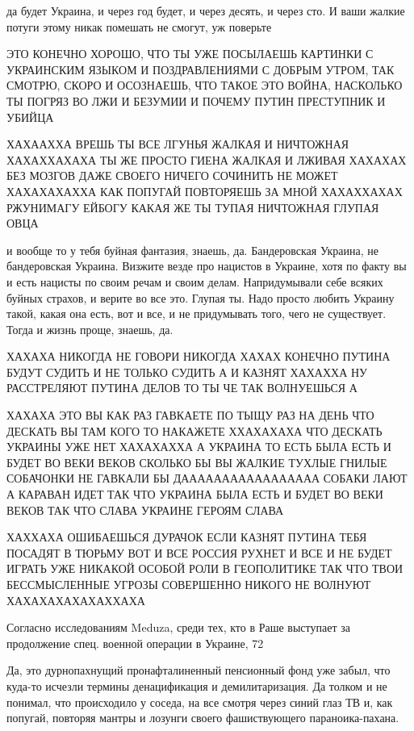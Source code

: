да будет Украина, и через год будет, и через десять, и через сто. И ваши жалкие
потуги этому никак помешать не смогут, уж поверьте

ЭТО КОНЕЧНО ХОРОШО, ЧТО ТЫ УЖЕ ПОСЫЛАЕШЬ КАРТИНКИ С УКРАИНСКИМ ЯЗЫКОМ И
ПОЗДРАВЛЕНИЯМИ С ДОБРЫМ УТРОМ, ТАК СМОТРЮ, СКОРО И ОСОЗНАЕШЬ, ЧТО ТАКОЕ ЭТО
ВОЙНА, НАСКОЛЬКО ТЫ ПОГРЯЗ ВО ЛЖИ И БЕЗУМИИ И ПОЧЕМУ ПУТИН ПРЕСТУПНИК И УБИЙЦА

ХАХААХХА ВРЕШЬ ТЫ ВСЕ ЛГУНЬЯ ЖАЛКАЯ И НИЧТОЖНАЯ ХАХАХХАХАХА ТЫ ЖЕ ПРОСТО ГИЕНА
ЖАЛКАЯ И ЛЖИВАЯ ХАХАХАХ БЕЗ МОЗГОВ ДАЖЕ СВОЕГО НИЧЕГО СОЧИНИТЬ НЕ МОЖЕТ
ХАХАХАХАХХА КАК ПОПУГАЙ ПОВТОРЯЕШЬ ЗА МНОЙ ХАХАХХАХАХ РЖУНИМАГУ ЕЙБОГУ КАКАЯ ЖЕ
ТЫ ТУПАЯ НИЧТОЖНАЯ ГЛУПАЯ ОВЦА




и вообще то у тебя буйная фантазия, знаешь, да. Бандеровская Украина, не
бандеровская Украина. Визжите везде про нацистов в Украине, хотя по факту вы и
есть нацисты по своим речам и своим делам. Напридумывали себе всяких буйных
страхов, и верите во все это. Глупая ты. Надо просто любить Украину такой,
какая она есть, вот и все, и не придумывать того, чего не существует. Тогда и
жизнь проще, знаешь, да.

ХАХАХА НИКОГДА НЕ ГОВОРИ НИКОГДА ХАХАХ КОНЕЧНО ПУТИНА БУДУТ СУДИТЬ И НЕ ТОЛЬКО
СУДИТЬ А И КАЗНЯТ ХАХАХХА НУ РАССТРЕЛЯЮТ ПУТИНА ДЕЛОВ ТО ТЫ ЧЕ ТАК ВОЛНУЕШЬСЯ А

ХАХАХА ЭТО ВЫ КАК РАЗ ГАВКАЕТЕ ПО ТЫЩУ РАЗ НА ДЕНЬ ЧТО ДЕСКАТЬ ВЫ ТАМ КОГО ТО
НАКАЖЕТЕ ХХАХАХАХА ЧТО ДЕСКАТЬ УКРАИНЫ УЖЕ НЕТ ХАХАХАХХА А УКРАИНА ТО ЕСТЬ БЫЛА
ЕСТЬ И БУДЕТ ВО ВЕКИ ВЕКОВ СКОЛЬКО БЫ ВЫ ЖАЛКИЕ ТУХЛЫЕ ГНИЛЫЕ СОБАЧОНКИ НЕ
ГАВКАЛИ БЫ ДААААААААААААААААА СОБАКИ ЛАЮТ А КАРАВАН ИДЕТ ТАК ЧТО УКРАИНА БЫЛА
ЕСТЬ И БУДЕТ ВО ВЕКИ ВЕКОВ ТАК ЧТО СЛАВА УКРАИНЕ ГЕРОЯМ СЛАВА


ХАХХАХА ОШИБАЕШЬСЯ ДУРАЧОК ЕСЛИ КАЗНЯТ ПУТИНА ТЕБЯ ПОСАДЯТ В ТЮРЬМУ ВОТ И ВСЕ
РОССИЯ РУХНЕТ И ВСЕ И НЕ БУДЕТ ИГРАТЬ УЖЕ НИКАКОЙ ОСОБОЙ РОЛИ В ГЕОПОЛИТИКЕ ТАК
ЧТО ТВОИ БЕССМЫСЛЕННЫЕ УГРОЗЫ СОВЕРШЕННО НИКОГО НЕ ВОЛНУЮТ ХАХАХАХАХАХАХХАХА

Согласно исследованиям Meduza, среди тех, кто в Раше выступает за продолжение
спец. военной операции в Украине, 72%

Да, это дурнопахнущий пронафталиненный пенсионный фонд уже забыл, что куда-то
исчезли термины денацификация и демилитаризация. Да толком и не понимал, что
происходило у соседа, на все смотря через синий глаз ТВ и, как попугай,
повторяя мантры и лозунги своего фашиствующего параноика-пахана. 

